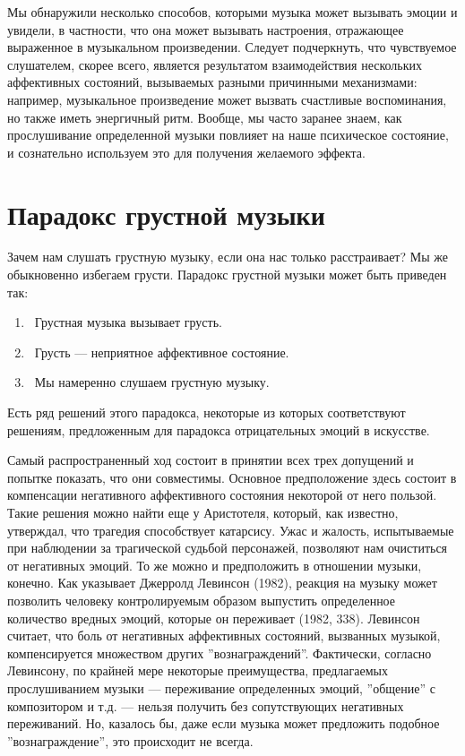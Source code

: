 \documentclass[11pt]{book}
\begin{document}
Мы обнаружили несколько способов, которыми музыка может вызывать эмоции и увидели, в частности, что она может вызывать настроения, отражающее выраженное в музыкальном произведении. Следует подчеркнуть, что чувствуемое слушателем, скорее всего, является результатом взаимодействия нескольких аффективных состояний, вызываемых разными причинными механизмами: например, музыкальное произведение может вызвать счастливые воспоминания, но также иметь энергичный ритм. Вообще, мы часто заранее знаем, как прослушивание определенной музыки повлияет на наше психическое состояние, и сознательно используем это для получения желаемого эффекта.

\section{Парадокс грустной музыки}

Зачем нам слушать грустную музыку, если она нас только расстраивает? Мы же обыкновенно избегаем грусти. Парадокс грустной музыки может быть приведен так:

\begin{enumerate}
  \item\ Грустная музыка вызывает грусть.
  \item\ Грусть --- неприятное аффективное состояние.
  \item\ Мы намеренно слушаем грустную музыку.
\end{enumerate}

Есть ряд решений этого парадокса, некоторые из которых соответствуют решениям, предложенным для парадокса отрицательных эмоций в искусстве.

Самый распространенный ход состоит в принятии всех трех допущений и попытке показать, что они совместимы. Основное предположение здесь состоит в компенсации негативного аффективного состояния некоторой от него пользой. Такие решения можно найти еще у Аристотеля, который, как известно, утверждал, что трагедия способствует катарсису. Ужас и жалость, испытываемые при наблюдении за трагической судьбой персонажей, позволяют нам очиститься от негативных эмоций. То же можно и предположить в отношении музыки, конечно. Как указывает Джерролд Левинсон (1982), реакция на музыку может позволить человеку контролируемым образом выпустить определенное количество вредных эмоций, которые он переживает (1982, 338). Левинсон считает, что боль от негативных аффективных состояний, вызванных музыкой, компенсируется множеством других ''вознаграждений''. Фактически, согласно Левинсону, по крайней мере некоторые преимущества, предлагаемых прослушиванием музыки --- переживание определенных эмоций, ''общение'' с композитором и т.д. --- нельзя получить без сопутствующих негативных переживаний. Но, казалось бы, даже если музыка может предложить подобное ''вознаграждение'', это происходит не всегда.
\end{document}
